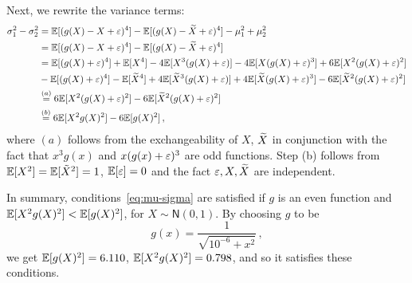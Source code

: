 \documentclass[11pt]{article}
\def\normal{\mathsf{N}}
\begin{document}
Next, we rewrite the variance terms:
\begin{align*}
\sigma_1^2-\sigma_2^2&={\mathbb E}[ (g(X)-X+{\varepsilon})^4 ] - {\mathbb E}[ (g(X)-{\widetilde{X}}+{\varepsilon})^4 ] -\mu_1^2+\mu_2^2\\
&={\mathbb E}[ (g(X)-X+{\varepsilon})^4 ] - {\mathbb E}[ (g(X)-{\widetilde{X}}+{\varepsilon})^4 ]\\
&={\mathbb E}[(g(X)+{\varepsilon})^4] +{\mathbb E}[X^4] - 4{\mathbb E}[X^3(g(X)+{\varepsilon})]-4{\mathbb E}[X(g(X)+{\varepsilon})^3]+6{\mathbb E}[X^2(g(X)+{\varepsilon})^2]\\
&-{\mathbb E}[(g(X)+{\varepsilon})^4] -{\mathbb E}[{\widetilde{X}}^4] +4{\mathbb E}[{\widetilde{X}}^3(g(X)+{\varepsilon})]+4{\mathbb E}[{\widetilde{X}}(g(X)+{\varepsilon})^3]-6 {\mathbb E}[{\widetilde{X}}^2(g(X)+{\varepsilon})^2]\\
&\stackrel{(a)}{=} 6 {\mathbb E}[X^2(g(X)+{\varepsilon})^2]-6{\mathbb E}[{\widetilde{X}}^2(g(X)+{\varepsilon})^2]\\
& \stackrel{(b)}{=} 6 {\mathbb E}[X^2g(X)^2]-6{\mathbb E}[g(X)^2]\,,
\end{align*}
where $(a)$ follows from the exchangeability of $X$, ${\widetilde{X}}$ in conjunction  with the fact that $x^3g(x)$ and  $x(g(x)+{\varepsilon})^3$ are odd functions. Step (b) follows from ${\mathbb E}[X^2] = {\mathbb E}[\tilde{X}^2]=1$, ${\mathbb E}[{\varepsilon}] = 0$ and the fact  ${\varepsilon}, X,{\widetilde{X}}$ are independent.  

In summary,  conditions~\eqref{eq:mu-sigma} are satisfied if $g$ is an even function and ${\mathbb E}[X^2g(X)^2]<{\mathbb E}[g(X)^2]$, for $X\sim \normal(0,1)$.  By choosing $g$ to be 
\[
g(x)=\frac{1}{\sqrt{10^{-6}+x^2}}\,,
\]
we get ${\mathbb E}[g(X)^2] =6.110$, ${\mathbb E}[X^2g(X)^2]=0.798$, and so it satisfies these conditions. 



\end{document}
